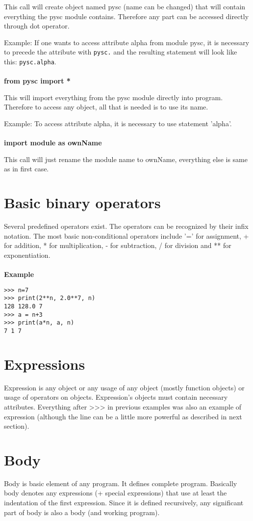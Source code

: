 \documentclass[11pt,oneside]{fithesis2}
\newcommand{\markit}[1]{\ \\\\{\noindent\textbf{#1}}}
\newcommand{\T}[1]{\texttt{#1}}
\begin{document}
This call will create object named pysc (name can be changed) that will contain everything the pysc module contains. Therefore any part can be accessed directly through dot operator.

Example: If one wants to access attribute alpha from module pysc, it is necessary to precede the attribute with \T{pysc.} and the resulting statement will look like this: \T{pysc.alpha}.
\markit{from pysc import *}

This will import everything from the pysc module directly into program. Therefore to access any object, all that is needed is to use its name.

Example: To access attribute alpha, it is necessary to use statement 'alpha'.
\markit{import module as ownName}

This call will just rename the module name to ownName, everything else is same as in first case.

\section{Basic binary operators}
Several predefined operators exist. The operators can be recognized by their infix notation. The most basic non-conditional operators include '=' for assignment, + for addition, * for multiplication, - for subtraction, / for division and ** for exponentiation.
\markit{Example}
\begin{lstlisting}
>>> n=7
>>> print(2**n, 2.0**7, n)
128 128.0 7
>>> a = n+3
>>> print(a*n, a, n)
7 1 7
\end{lstlisting}

\section{Expressions}
Expression is any object or any usage of any object (mostly function objects) or usage of operators on objects. Expression's objects must contain necessary attributes. Everything after >>> in previous examples was also an example of expression (although the line can be a little more powerful as described in next section).

\section{Body}
Body is basic element of any program. It defines complete program. Basically body denotes any expressions (+ special expressions) that use at least the indentation of the first expression. Since it is defined recursively, any significant part of body is also a body (and working program).
\end{document}
